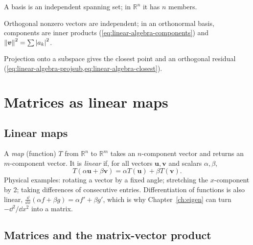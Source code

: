 \begin{keyideas}
\item A basis is an independent spanning set; in $\mathbb R^n$ it has $n$ members.
\item Orthogonal nonzero vectors are independent; in an orthonormal basis, components are inner products (\cref{eq:linear-algebra-components}) and $\left\lVert \bm v\right\rVert^2=\sum\left\lvert a_k\right\rvert^2$.
\item Projection onto a subspace gives the closest point and an orthogonal residual (\cref{eq:linear-algebra-projsub,eq:linear-algebra-closest}).
\end{keyideas}

\section{Matrices as linear maps}\label{sec:linear-algebra-maps}

\subsection{Linear maps}

A \emph{map} (function) $T$ from $\mathbb R^n$ to $\mathbb R^m$ takes an $n$-component vector and returns an $m$-component vector. It is \emph{linear} if, for all vectors $\bm u,\bm v$ and scalars $\alpha,\beta$,
\begin{equation}
T(\alpha\bm u+\beta\bm v)=\alpha T(\bm u)+\beta T(\bm v).
\label{eq:linear-algebra-linear}
\end{equation}
Physical examples: rotating a vector by a fixed angle; stretching the $x$-component by 2; taking differences of consecutive entries. Differentiation of functions is also linear, $\frac{\dd}{\dd x}(\alpha f+\beta g)=\alpha f'+\beta g'$, which is why Chapter~\ref{ch:eigen} can turn $-\dd^2/\dd x^2$ into a matrix.

\subsection{Matrices and the matrix-vector product}

